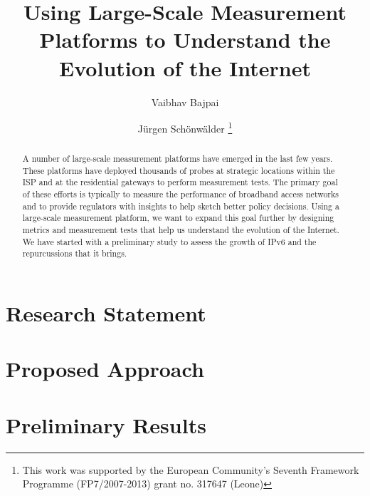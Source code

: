 \documentclass[a4paper]{llncs}
\begin{document}
\mainmatter  %

\title{Using Large-Scale Measurement Platforms to Understand the Evolution of
the Internet}

\author{Vaibhav Bajpai \and Jürgen Schönwälder%
\thanks{This work was supported by the European Community’s Seventh Framework
Programme (FP7/2007-2013) grant no. 317647 (Leone)}}
\maketitle

\begin{abstract}

A number of large-scale measurement platforms have emerged in the last few
years. These platforms have deployed thousands of probes at strategic
locations within the \ac{ISP} and at the residential gateways to perform
measurement tests. The primary goal of these efforts is typically to measure
the performance of broadband access networks and to provide regulators with
insights to help sketch better policy decisions. Using a large-scale
measurement platform, we want to expand this goal further by designing metrics
and measurement tests that help us understand the evolution of the Internet.
We have started with a preliminary study to assess the growth of IPv6 and the
repurcussions that it brings.

\end{abstract}


\section{Research Statement}
\label{sec:rstatement}
\section{Proposed Approach}
\label{sec:approach}
\section{Preliminary Results}
\label{sec:preliminaryresults}





\end{document}
